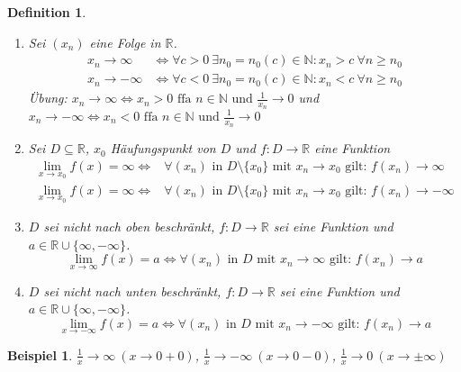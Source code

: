 \documentclass[14pt,titlepage,ngerman,a4paper,headsepline,DIV15,halfparskip*]{scrartcl}
\newcommand{\N}{\mathbb{N}}
\newcommand{\R}{\mathbb{R}}
\theoremstyle{named}
\theoremstyle{dotless}
\newtheorem{beispiel}[namedtheorem]{Beispiel}
\newtheorem*{definition}{Definition}
\begin{document}
\begin{definition} ~\
	\begin{enumerate}
		\item Sei $(x_{n})$ eine Folge in $\R$.
			\begin{align*}
				x_{n} \rightarrow \infty & \iff \forall c > 0 ~\exists n_{0} = n_{0}(c) \in \N: x_{n} > c ~\forall n \geq n_{0} \\
				x_{n} \rightarrow - \infty & \iff \forall c < 0 ~\exists n_{0} = n_{0}(c) \in \N: x_{n} < c ~\forall n \geq n_{0} 
			\end{align*}
			Übung: $x_{n} \rightarrow \infty \iff x_{n} > 0 \text{ ffa } n \in \N \text{ und } \frac{1}{x_{n}} \rightarrow 0$ und \\
				$x_{n} \rightarrow -\infty\iff x_{n} < 0 \text{ ffa } n \in \N \text{ und } \frac{1}{x_{n}} \rightarrow 0$
		\item Sei $D \subseteq \R$, $x_{0}$ Häufungspunkt von $D$ und $f \colon D \rightarrow \R$ eine Funktion
			\begin{align*}
				\lim_{x \rightarrow x_{0}} f(x) = \infty \iff & \forall (x_{n}) \text{ in } D \setminus \{ x_{0} \} \text{ mit } x_{n} \rightarrow x_{0} \text{ gilt: } f(x_{n}) \rightarrow \infty \\
				\lim_{x \rightarrow x_{0}} f(x) = \infty \iff & \forall (x_{n}) \text{ in } D \setminus \{ x_{0} \} \text{ mit } x_{n} \rightarrow x_{0} \text{ gilt: } f(x_{n}) \rightarrow -\infty
			\end{align*}
		\item $D$ sei nicht nach oben beschränkt, $f \colon D \rightarrow \R$ sei eine Funktion und $a \in \R \cup \{ \infty, - \infty \}$.
			$$ \lim_{x \rightarrow \infty} f(x) = a \iff \forall (x_{n}) \text{ in } D \text{ mit } x_{n} \rightarrow \infty \text{ gilt: } f(x_{n}) \rightarrow a $$
		\item $D$ sei nicht nach unten beschränkt, $f \colon D \rightarrow \R$ sei eine Funktion und $a \in \R \cup \{ \infty, - \infty \}$.
			$$ \lim_{x \rightarrow -\infty} f(x) = a \iff \forall (x_{n}) \text{ in } D \text{ mit } x_{n} \rightarrow -\infty \text{ gilt: } f(x_{n}) \rightarrow a $$		
	\end{enumerate}
\end{definition}


\begin{beispiel}
	$\frac{1}{x} \rightarrow \infty ~(x \rightarrow 0 + 0)$, $\frac{1}{x} \rightarrow -\infty ~(x \rightarrow 0 - 0)$, $\frac{1}{x} \rightarrow 0 ~(x \rightarrow \pm \infty)$
\end{beispiel}
\end{document}

